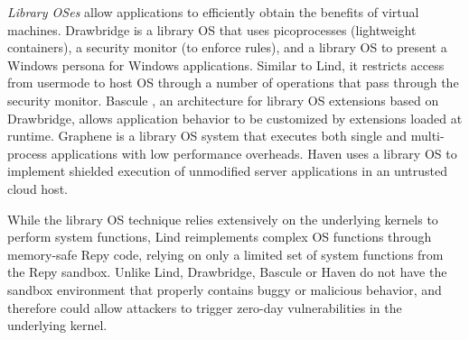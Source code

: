 \textit{Library OSes}
allow applications to efficiently
obtain the benefits of virtual machines.
%
Drawbridge \cite{Drawbridge-11} is a library OS that uses picoprocesses
(lightweight containers), a security monitor (to enforce rules),
and a library OS to present a Windows persona for %
Windows applications. Similar to Lind,
it restricts access from usermode to host OS through a number
of operations that pass through the security monitor.
%
%
Bascule \cite{Bascule}, an architecture for library OS extensions
based on Drawbridge, allows application behavior to be customized by
extensions loaded at runtime.
Graphene \cite{Graphene-14} is a library OS system that
executes both single and
multi-process applications with low performance overheads.
Haven \cite{Haven} uses a library OS to implement
shielded execution of unmodified server applications
in an untrusted cloud host.

While the library OS technique relies extensively on
the underlying kernels to perform system functions, 
Lind reimplements complex OS functions through memory-safe Repy 
code, relying on only a limited set of system functions from the Repy 
sandbox. Unlike Lind, Drawbridge, Bascule 
or Haven do not have the sandbox environment that properly contains 
buggy or malicious behavior, and therefore could allow attackers 
to trigger zero-day vulnerabilities in the underlying kernel. 


